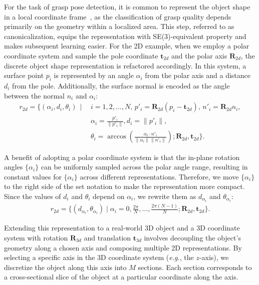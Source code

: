 For the task of grasp pose detection, it is common to represent the object shape in a local coordinate frame~\cite{gpd,mousavian2019graspnet}, as the classification of grasp quality depends primarily on the geometry within a localized area. This step, referred to as canonicalization, equips the representation with SE(3)-equivalent property and makes subsequent learning easier. For the 2D example, when we employ a polar coordinate system and sample the pole coordinate $\mathbf{t}_{2d}$ and the polar axis $\mathbf{R}_{2d}$, the discrete object shape representation is refactored accordingly. In this system, a surface point $p_i$ is represented by an angle $\alpha_i$ from the polar axis and a distance $d_i$ from the pole. Additionally, the surface normal is encoded as the angle between the normal $n_i$ and $\alpha_i$:
\begin{align}
r_{2d} = \bigg\{ (\alpha_i, d_i, \theta_i) \, \mid \, & i = 1, 2, \ldots, N, \, p'_i = \mathbf{R}_{2d}(p_i - \mathbf{t}_{2d}), \, n'_i = \mathbf{R}_{2d}n_i, \nonumber \\
& \alpha_{i} = \frac{p'_{i}}{\|p'_{i}\|},  d_{i} = \|p'_{i}\|, \nonumber \\
& \theta_{i} = \arccos\left(\frac{\alpha_{i} \cdot n'_{i}}{\|\alpha_{i}\|\|n'_{i}\|}\right) ; \mathbf{R}_{2d},  \mathbf{t}_{2d} \bigg\}.
\end{align}

A benefit of adopting a polar coordinate system is that the in-plane rotation angles $\{\alpha_{i}\}$ can be uniformly sampled across the polar angle range, resulting in constant values for $\{\alpha_{i}\}$ across different representations. Therefore, we move $\{\alpha_{i}\}$ to the right side of the set notation to make the representation more compact. Since the values of $d_i$ and $\theta_i$ depend on $\alpha_{i}$, we rewrite them as $d_{\alpha_{i}}$ and $\theta_{\alpha_{i}}$:
\begin{align} 
r_{2d} = \bigg\{ (d_{\alpha_i}, \theta_{\alpha_i}) \mid \alpha_i = 0, \frac{2\pi}{N}, \ldots, \frac{2\pi (N-1)}{N} ; \mathbf{R}_{2d},  \mathbf{t}_{2d} \bigg\}. 
\end{align}

Extending this representation to a real-world 3D object and a 3D coordinate system with rotation $ \mathbf{R}_{3d}$ and translation $\mathbf{t}_{3d}$ involves decoupling the object's geometry along a chosen axis and composing multiple 2D representations.  By selecting a specific axis in the 3D coordinate system (\textit{e.g.}, the $z$-axis), we discretize the object along this axis into $M$ sections. Each section corresponds to a cross-sectional slice of the object at a particular coordinate along the axis.


